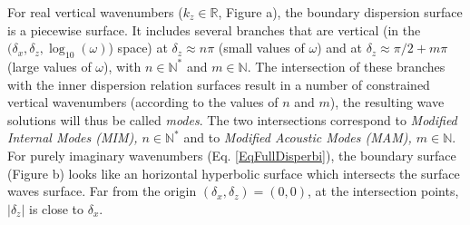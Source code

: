 For real vertical wavenumbers ($k_z\in\mathbb{R}$, Figure a), the boundary dispersion surface is a piecewise surface. It includes several branches that are vertical (in the $(\delta_x, \delta_z, \log_{10}(\omega)$) space) at $\delta_z \approx n\pi$ (small values of $\omega$) and at $\delta_z \approx \pi/2+m\pi$ (large values of $\omega$), with $n\in\mathbb{N}^\ast$ and $m\in\mathbb{N}$. The intersection of these branches with the inner dispersion relation surfaces result in a number of constrained vertical wavenumbers (according to the values of $n$ and $m$), the resulting wave solutions will thus be called {\it modes}. The two intersections correspond to {\it Modified Internal Modes (MIM),  $n\in\mathbb{N}^\ast$} and to {\it Modified Acoustic Modes (MAM), $m\in\mathbb{N}$}.\\
For purely imaginary wavenumbers (Eq. \ref{EqFullDisperbi}), the boundary surface (Figure b) looks like an horizontal hyperbolic surface which intersects the surface waves surface. Far from the origin $(\delta_x,\delta_z)=(0,0)$, at the intersection points, $|\delta_z|$ is close to $\delta_x$.
